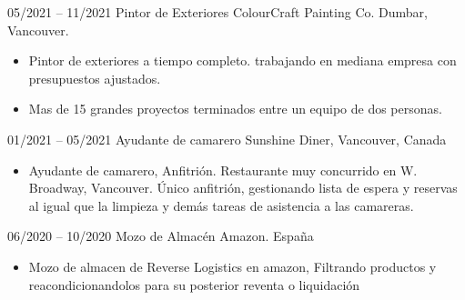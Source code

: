 \documentclass[9pt]{developercv} %
\begin{document}
\vspace{-10 pt}
\begin{entrylist}
	\entry
        {05/2021 -- 11/2021}
		{Pintor de Exteriores}
		{ColourCraft Painting Co. Dumbar, Vancouver.}
		{\vspace{-10pt}
        \begin{itemize}[noitemsep,topsep=0pt,parsep=0pt,partopsep=0pt, leftmargin=-1pt]
            \item Pintor de exteriores a tiempo completo. trabajando en mediana empresa con presupuestos ajustados.
            \item Mas de 15 grandes proyectos terminados  entre un equipo de dos personas.

        \end{itemize} 
        }
	\entry
		{01/2021 -- 05/2021}
		{Ayudante de camarero}
		{Sunshine Diner, Vancouver, Canada}
		{\vspace{-10pt}
        \begin{itemize}[noitemsep,topsep=0pt,parsep=0pt,partopsep=0pt, leftmargin=-1pt]
            \item Ayudante de camarero, Anfitrión. Restaurante muy concurrido en W. Broadway, Vancouver. Único anfitrión, gestionando lista de espera y reservas al igual que la limpieza y demás tareas de asistencia a las camareras.

        \end{itemize} 
        }
        \entry
        {06/2020 -- 10/2020}
		{Mozo de Almacén}
		{Amazon. España}
		{\vspace{-10pt}
        \begin{itemize}[noitemsep,topsep=0pt,parsep=0pt,partopsep=0pt, leftmargin=-1pt]
            \item Mozo de almacen de Reverse Logistics en amazon, Filtrando productos y reacondicionandolos para su posterior reventa o liquidación 

        \end{itemize} 
        }
\end{entrylist}

\vspace{-10 pt}
    \vspace{-6pt}
    
\end{document}
